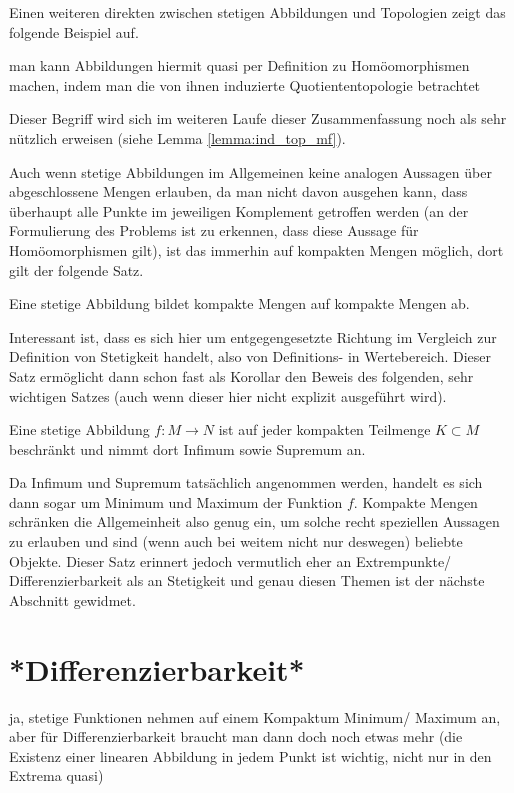 \documentclass[../H_Analysis_main.tex]{subfiles}
\begin{document}
Einen weiteren direkten zwischen stetigen Abbildungen und Topologien zeigt das folgende Beispiel auf.

\begin{bsp}[Quotiententopologie]
man kann Abbildungen hiermit quasi per Definition zu Homöomorphismen machen, indem man die von ihnen induzierte Quotiententopologie betrachtet
\end{bsp}

Dieser Begriff wird sich im weiteren Laufe dieser Zusammenfassung noch als sehr nützlich erweisen (siehe Lemma \ref{lemma:ind_top_mf}).


Auch wenn stetige Abbildungen im Allgemeinen keine analogen Aussagen über abgeschlossene Mengen erlauben, da man nicht davon ausgehen kann, dass überhaupt alle Punkte im jeweiligen Komplement getroffen werden (an der Formulierung des Problems ist zu erkennen, dass diese Aussage für Homöomorphismen gilt), ist das immerhin auf kompakten Mengen möglich, dort gilt der folgende Satz.

\begin{satz}
Eine stetige Abbildung bildet kompakte Mengen auf kompakte Mengen ab.
\end{satz}

Interessant ist, dass es sich hier um entgegengesetzte Richtung im Vergleich zur Definition von Stetigkeit handelt, also von Definitions- in Wertebereich. Dieser Satz ermöglicht dann schon fast als Korollar den Beweis des folgenden, sehr wichtigen Satzes (auch wenn dieser hier nicht explizit ausgeführt wird).

\begin{satz}
Eine stetige Abbildung $f: M \rightarrow N$ ist auf jeder kompakten Teilmenge $K \subset M$ beschränkt und nimmt dort Infimum sowie Supremum an.
\end{satz}

Da Infimum und Supremum tatsächlich angenommen werden, handelt es sich dann sogar um Minimum und Maximum der Funktion $f$. Kompakte Mengen schränken die Allgemeinheit also genug ein, um solche recht speziellen Aussagen zu erlauben und sind (wenn auch bei weitem nicht nur deswegen) beliebte Objekte. Dieser Satz erinnert jedoch vermutlich eher an Extrempunkte/ Differenzierbarkeit als an Stetigkeit und genau diesen Themen ist der nächste Abschnitt gewidmet.


\newpage


	\section{*Differenzierbarkeit*}
ja, stetige Funktionen nehmen auf einem Kompaktum Minimum/ Maximum an, aber für Differenzierbarkeit braucht man dann doch noch etwas mehr (die Existenz einer linearen Abbildung in jedem Punkt ist wichtig, nicht nur in den Extrema quasi)
\end{document}
